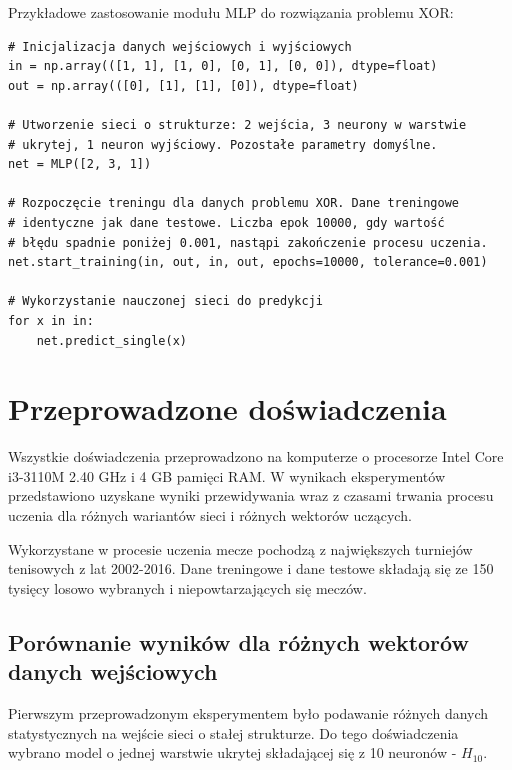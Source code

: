 \pagebreak

Przykładowe zastosowanie modułu MLP do rozwiązania problemu XOR:
\begin{verbatim}
# Inicjalizacja danych wejściowych i wyjściowych
in = np.array(([1, 1], [1, 0], [0, 1], [0, 0]), dtype=float)
out = np.array(([0], [1], [1], [0]), dtype=float)

# Utworzenie sieci o strukturze: 2 wejścia, 3 neurony w warstwie 
# ukrytej, 1 neuron wyjściowy. Pozostałe parametry domyślne.
net = MLP([2, 3, 1])

# Rozpoczęcie treningu dla danych problemu XOR. Dane treningowe 
# identyczne jak dane testowe. Liczba epok 10000, gdy wartość
# błędu spadnie poniżej 0.001, nastąpi zakończenie procesu uczenia.
net.start_training(in, out, in, out, epochs=10000, tolerance=0.001)

# Wykorzystanie nauczonej sieci do predykcji
for x in in:
    net.predict_single(x)
\end{verbatim}



\chapter{Przeprowadzone doświadczenia}

Wszystkie doświadczenia przeprowadzono na komputerze o procesorze Intel Core i3-3110M 2.40 GHz i 4 GB pamięci RAM. W wynikach eksperymentów przedstawiono uzyskane wyniki przewidywania wraz z czasami trwania procesu uczenia dla różnych wariantów sieci i różnych wektorów uczących.

Wykorzystane w procesie uczenia mecze pochodzą z największych turniejów tenisowych z lat 2002-2016. Dane treningowe i dane testowe składają się ze 150 tysięcy losowo wybranych i niepowtarzających się meczów.

\section{Porównanie wyników dla różnych wektorów danych wejściowych}
\label{Sec:VsXIn}

Pierwszym przeprowadzonym eksperymentem było podawanie różnych danych statystycznych na wejście sieci o stałej strukturze. Do tego doświadczenia wybrano model o jednej warstwie ukrytej składającej się z 10 neuronów - $H_{10}$. 

